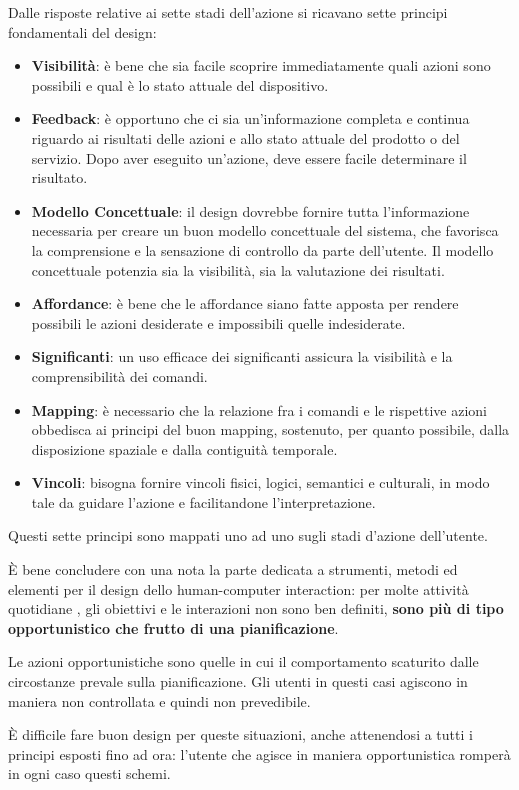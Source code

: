 \documentclass[a4paper,11pt,oneside]{book}
\begin{document}
Dalle risposte relative ai sette stadi dell'azione si ricavano sette principi fondamentali del design:

\begin{itemize}
	\item \textbf{Visibilità}: è bene che sia facile scoprire immediatamente quali azioni sono possibili e qual è lo stato attuale del dispositivo.
	\item \textbf{Feedback}: è opportuno che ci sia un'informazione completa e continua riguardo ai risultati delle azioni e allo stato attuale del prodotto o del servizio. Dopo aver eseguito un'azione, deve essere facile determinare il risultato.
	\item \textbf{Modello Concettuale}: il design dovrebbe fornire tutta l'informazione necessaria per creare un buon modello concettuale del sistema, che favorisca la comprensione e la sensazione di controllo da parte dell'utente. Il modello concettuale potenzia sia la visibilità, sia la valutazione dei risultati.
	\item \textbf{Affordance}: è bene che le affordance siano fatte apposta per rendere possibili le azioni desiderate e impossibili quelle indesiderate.
	\item \textbf{Significanti}: un uso efficace dei significanti assicura la visibilità e la comprensibilità dei comandi.
	\item \textbf{Mapping}: è necessario che la relazione fra i comandi e le rispettive azioni obbedisca ai principi del buon mapping, sostenuto, per quanto possibile, dalla disposizione spaziale e dalla contiguità temporale.
	\item \textbf{Vincoli}: bisogna fornire vincoli fisici, logici, semantici e culturali, in modo tale da guidare l'azione e facilitandone l'interpretazione.
\end{itemize}
Questi sette principi sono mappati uno ad uno sugli stadi d'azione dell'utente.

È bene concludere con una nota la parte dedicata a strumenti, metodi ed elementi per il design dello human-computer interaction: per molte attività quotidiane , gli obiettivi e le interazioni non sono ben definiti, \textbf{sono più di tipo opportunistico che frutto di una pianificazione}.

Le azioni opportunistiche sono quelle in cui il comportamento scaturito dalle circostanze prevale sulla pianificazione. Gli utenti in questi casi agiscono in maniera non controllata e quindi non prevedibile.

È difficile fare buon design per queste situazioni, anche attenendosi a tutti i principi esposti fino ad ora: l'utente che agisce in maniera opportunistica romperà in ogni caso questi schemi.
\end{document}
